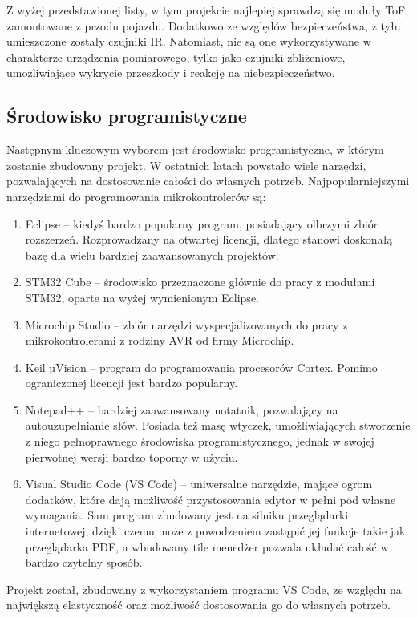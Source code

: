             Z wyżej przedstawionej listy, w tym projekcie najlepiej sprawdzą się moduły ToF, zamontowane z przodu pojazdu.
            Dodatkowo ze względów bezpieczeństwa, z tyłu umieszczone zostały czujniki IR.
            Natomiast, nie są one wykorzystywane w charakterze urządzenia pomiarowego, tylko jako czujniki zbliżeniowe, umożliwiające wykrycie przeszkody i reakcję na niebezpieczeństwo.

    \subsection{Środowisko programistyczne}
        Następnym kluczowym wyborem jest środowisko programistyczne, w którym zostanie zbudowany projekt.
        W ostatnich latach powstało wiele narzędzi, pozwalających na dostosowanie całości do własnych potrzeb.
        Najpopularniejszymi narzędziami do programowania mikrokontrolerów są:
        \begin{enumerate}
            \item Eclipse -- kiedyś bardzo popularny program, posiadający olbrzymi zbiór rozszerzeń.
            Rozprowadzany na otwartej licencji, dlatego stanowi doskonałą bazę dla wielu bardziej zaawansowanych projektów.
            \item STM32 Cube -- środowisko przeznaczone głównie do pracy z modułami STM32, oparte na wyżej wymienionym Eclipse.
            \item Microchip Studio -- zbiór narzędzi wyspecjalizowanych do pracy z mikrokontrolerami z rodziny AVR od firmy Microchip.
            \item Keil µVision -- program do programowania procesorów Cortex. Pomimo ograniczonej licencji jest bardzo popularny.
            \item Notepad++ -- bardziej zaawansowany notatnik, pozwalający na autouzupełnianie słów.
            Posiada też masę wtyczek, umożliwiających stworzenie z niego pełnoprawnego środowiska programistycznego, jednak w swojej pierwotnej wersji bardzo toporny w użyciu.
            \item Visual Studio Code (VS Code) -- uniwersalne narzędzie, mające ogrom dodatków, które dają możliwość przystosowania edytor w pełni pod własne wymagania.
            Sam program zbudowany jest na silniku przeglądarki internetowej, dzięki czemu może z powodzeniem zastąpić jej funkcje takie jak: przeglądarka PDF, a wbudowany tile menedżer pozwala układać całość w bardzo czytelny sposób.
        \end{enumerate}
        Projekt został, zbudowany z wykorzystaniem programu VS Code, ze względu na największą elastyczność oraz możliwość dostosowania go do własnych potrzeb.


